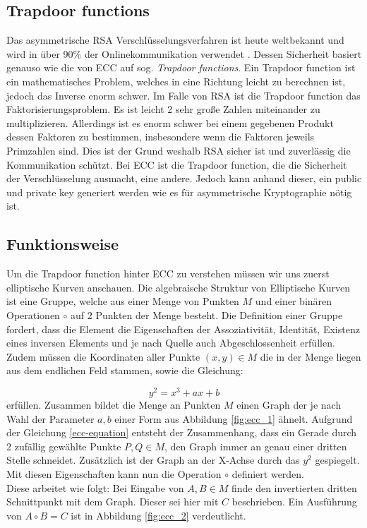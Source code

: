 \documentclass[11pt,a4paper]{scrreprt}
\begin{document}
\subsection{Trapdoor functions}
Das asymmetrische RSA Verschlüsselungsverfahren ist heute weltbekannt und wird in über 90\% der Onlinekommunikation verwendet \cite{ecc-rsa_amount}. Dessen Sicherheit basiert genauso wie die von ECC auf sog.  \textit{Trapdoor functions}. Ein Trapdoor function ist ein mathematisches Problem, welches in eine Richtung leicht zu berechnen ist, jedoch das Inverse enorm schwer. Im Falle von RSA ist die Trapdoor function das Faktorisierungsproblem. Es ist leicht 2 sehr große Zahlen miteinander zu multiplizieren. Allerdings ist es enorm schwer bei einem gegebenen Produkt dessen Faktoren zu bestimmen, insbesondere wenn die Faktoren jeweils Primzahlen sind. Dies ist der Grund weshalb RSA sicher ist und zuverlässig die Kommunikation schützt. Bei ECC ist die Trapdoor function, die die Sicherheit der Verschlüsselung ausmacht, eine andere. Jedoch kann anhand dieser, ein public und private key generiert werden wie es für asymmetrische Kryptographie nötig ist.
\subsection{Funktionsweise}
Um die Trapdoor function hinter ECC zu verstehen müssen wir uns zuerst elliptische Kurven anschauen. Die algebraische Struktur von Elliptische Kurven ist eine Gruppe, welche aus einer Menge von Punkten $M$ und einer binären Operationen $\circ$ auf 2 Punkten der Menge besteht. Die Definition einer Gruppe fordert, dass die Element die Eigenschaften der Assoziativität, Identität, Existenz eines inversen Elements und je nach Quelle auch Abgeschlossenheit erfüllen. \cite{ecc-aradi2016einfuhrung}\cite{ecc-bogopolʹskij2008introduction} Zudem müssen die Koordinaten aller Punkte $(x,y) \in M$ die in der Menge liegen aus dem endlichen Feld stammen, sowie die Gleichung:

\begin{equation}
    \label{ecc-equation}
    y^2 = x^3+ax+b
\end{equation} erfüllen. Zusammen bildet die Menge an Punkten $M$ einen Graph der je nach Wahl der Parameter $a,b$ einer Form aus Abbildung \ref{fig:ecc_1} ähnelt. Aufgrund der Gleichung \ref{ecc-equation} entsteht der Zusammenhang, dass ein Gerade durch 2 zufällig gewählte Punkte $P,Q \in M$,  den Graph immer an genau einer dritten Stelle schneidet. Zusätzlich ist der Graph an der X-Achse durch das $y^2$ gespiegelt. Mit diesen Eigenschaften kann nun die Operation $\circ$ definiert werden.\\
Diese arbeitet wie folgt: Bei Eingabe von $A,B \in M$ finde den invertierten dritten Schnittpunkt mit dem Graph. Dieser sei hier mit $C$ beschrieben. Ein Ausführung von $A \circ B = C$ ist in Abbildung \ref{fig:ecc_2} verdeutlicht.
\end{document}
